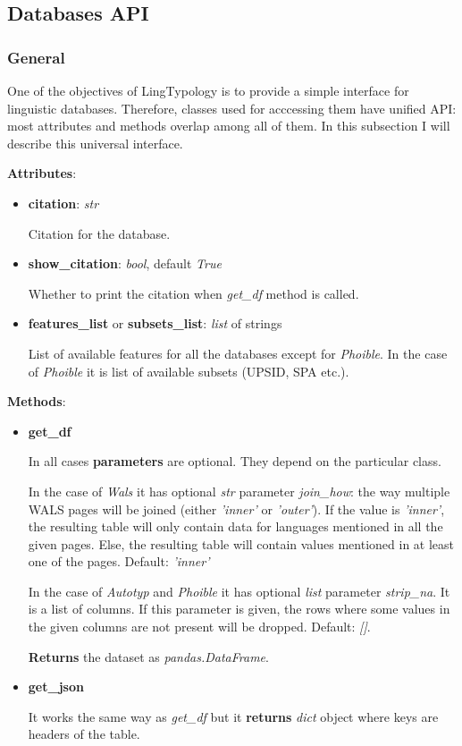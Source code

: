 \documentclass[a4paper,12pt]{article}
\begin{document}
\subsection{Databases API}

\subsubsection{General}

One of the objectives of LingTypology is to provide a simple interface for linguistic databases. Therefore, classes used for acccessing them have unified API: most attributes and methods overlap among all of them. In this subsection I will describe this universal interface.

\textbf{Attributes}:
\begin{itemize}
 \item \textbf{citation}: \textit{str}
 
 Citation for the database.
 
 \item \textbf{show\_citation}: \textit{bool}, default \textit{True}
 
 Whether to print the citation when \textit{get\_df} method is called.
 
 \item \textbf{features\_list} or \textbf{subsets\_list}: \textit{list} of strings
 
 List of available features for all the databases except for \textit{Phoible}. In the case of \textit{Phoible} it is list of available subsets (UPSID, SPA etc.).
\end{itemize}


\textbf{Methods}:
\begin{itemize}
 \item \textbf{get\_df}
 
 In all cases \textbf{parameters} are optional. They depend on the particular class.
 
 In the case of \textit{Wals} it has optional \textit{str} parameter \textit{join\_how}: the way multiple WALS pages will be joined (either \textit{'inner'} or \textit{'outer'}). If the value is \textit{'inner'}, the resulting table will only contain data for languages mentioned in all the given pages. Else, the resulting table will contain values mentioned in at least one of the pages. Default: \textit{'inner'}
 
 In the case of \textit{Autotyp} and \textit{Phoible} it has optional \textit{list} parameter \textit{strip\_na}. It is a list of columns. If this parameter is given, the rows where some values in the given columns are not present will be dropped. Default: \textit{[]}.
 
 \textbf{Returns} the dataset as \textit{pandas.DataFrame}.
 
 \item \textbf{get\_json}
 
 It works the same way as \textit{get\_df} but it \textbf{returns} \textit{dict} object where keys are headers of the table.
 
\end{itemize}
\end{document}
